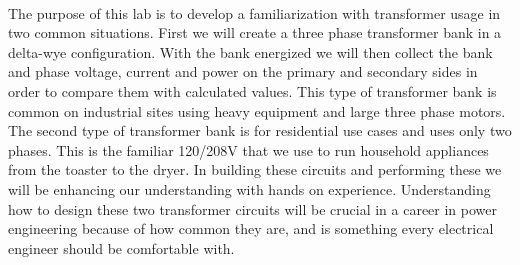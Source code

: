 \paragraph{}The purpose of this lab is to develop a familiarization with transformer usage in two common situations.
First we will create a three phase transformer bank in a delta-wye configuration. With the bank energized we will
then collect the bank and phase voltage, current and power on the primary and secondary sides in order to compare them with calculated
values. This type of transformer bank is common on industrial sites using heavy equipment and large three phase motors.
The second type of transformer bank is for residential use cases and uses only two phases. This is the familiar
120/208V that we use to run household appliances from the toaster to the dryer. In building these circuits and performing these
we will be enhancing our understanding with hands on experience. Understanding how to design these two transformer circuits will
be crucial in a career in power engineering because of how common they are, and is something every electrical engineer should be
comfortable with.
